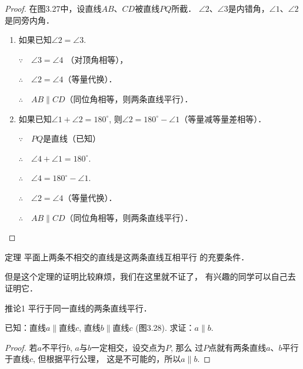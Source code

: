 \begin{proof}
   在图3.27中，设直线$AB$、$CD$被直线$PQ$所截．
$\angle 2$、$\angle 3$是内错角，$\angle 1$、$\angle 2$是同旁内角．
\begin{enumerate}
    \item 如果已知$\angle 2=\angle 3$. 

$\because\quad \angle 3=\angle 4$    （对顶角相等），

$\therefore\quad \angle 2=\angle 4$（等量代换）．

$\therefore\quad AB\parallel CD$（同位角相等，则两条直线平行）．

\item 如果已知$\angle 1+\angle 2=180^{\circ}$, 
则$\angle 2=180^{\circ}-\angle 1$（等量减等量差相等）．

$\because\quad PQ$是直线（已知）

$\therefore\quad \angle 4+\angle 1=180^{\circ}$.

$\therefore\quad \angle 4=180^{\circ}-\angle 1$.

$\therefore\quad \angle 2=\angle 4$（等量代换）．

$\therefore\quad AB\parallel CD$（同位角相等，则两条直线平行）．  
\end{enumerate}
\end{proof}

\begin{blk}{定理} 
    平面上两条不相交的直线是这两条直线互相平行
的充要条件．
\end{blk}


但是这个定理的证明比较麻烦，我们在这里就不证了，
有兴趣的同学可以自己去证明它．

\begin{blk}
   {推论1} 平行于同一直线的两条直线平行． 
\end{blk}

已知：直线$a\parallel$直线$c$, 直线$b\parallel$直线$c$ (图3.28).
 求证：$a\parallel b$.

\begin{proof}
    若$a$不平行$b$, $a$与$b$一定相交，设交点为$P$, 那么
过$P$点就有两条直线$a$、$b$平行于直线$c$, 但根据平行公理，
这是不可能的，所以$a\parallel b$.
\end{proof}

\begin{figure}[htp]
    \centering
{}
    \caption{}
\end{figure}


